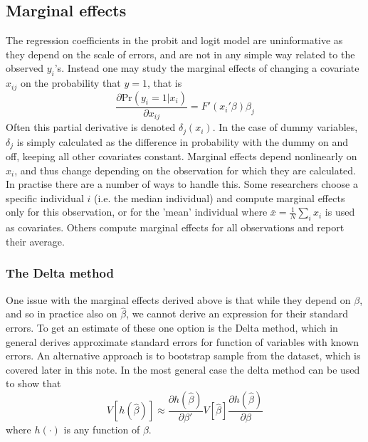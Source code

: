 \subsection{Marginal effects}
The regression coefficients in the probit and logit model are uninformative as they depend on the scale of errors, and are not in any simple way related to the observed $y_i$'s. Instead one may study the marginal effects of changing a covariate $x_{ij}$ on the probability that $y=1$, that is
\begin{equation}
  \frac{\partial \textrm{Pr}(y_i = 1 | x_i)}{\partial x_{ij}} = F'(x_i'\beta)\beta_j
\end{equation}
Often this partial derivative is denoted $\delta_j(x_i)$. In the case of dummy variables, $\delta_j$ is simply calculated as the difference in probability with the dummy on and off, keeping all other covariates constant. Marginal effects depend nonlinearly on $x_i$, and thus change depending on the observation for which they are calculated. In practise there are a number of ways to handle this. Some researchers choose a specific individual $i$ (i.e. the median individual) and compute marginal effects only for this observation, or for the 'mean' individual where $\bar{x}=\frac{1}{N}\sum_{i}x_i$ is used as covariates. Others compute marginal effects for all observations and report their average.

\subsubsection{The Delta method}
One issue with the marginal effects derived above is that while they depend on $\beta$, and so in practice also on $\hat{\beta}$, we cannot derive an expression for their standard errors. To get an estimate of these one option is the Delta method, which in general derives approximate standard errors for function of variables with known errors. An alternative approach is to bootstrap sample from the dataset, which is covered later in this note. In the most general case the delta method can be used to show that
\begin{equation}
  V[h(\hat{\beta})] \approx \frac{\partial h(\hat{\beta})}{\partial \beta'}V[\hat{\beta}]\frac{\partial h(\hat{\beta})}{\partial \beta}
\end{equation}
where $h(\cdot)$ is any function of $\beta$.

